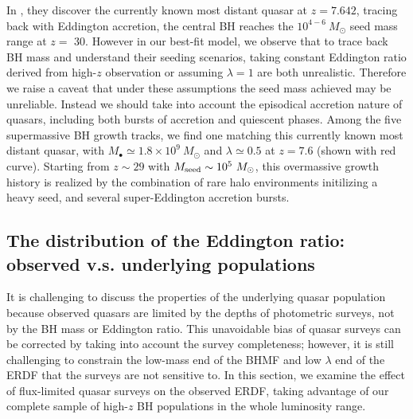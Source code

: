 \documentclass[twocolumn, twocolappendix]{aastex63}
\newcommand{\Msun}{M_\odot}
\newcommand{\red}[1]{\textcolor{red}{ #1}}
\begin{document}
\begin{CJK*}{UTF8}{gbsn}
In \citet{2021ApJ...907L...1W}, they discover the currently known most distant quasar at $z=7.642$, 
tracing back with Eddington accretion, the central BH reaches the $10^{4-6}~\Msun$ seed mass range at $z=$ 30. 
However in our best-fit model, we observe that to trace back BH mass and understand their seeding scenarios, 
taking constant Eddington ratio derived from high-$z$ observation or assuming $\lambda=1$ are both unrealistic. 
Therefore we raise a caveat that under these assumptions the seed mass achieved may be unreliable. 
Instead we should take into account the episodical accretion nature of quasars, 
including both bursts of accretion and quiescent phases.
Among the five supermassive BH growth tracks,
we find one matching this currently known most distant quasar, 
with $M_\bullet \simeq 1.8\times 10^9~\Msun$ and $\lambda \simeq 0.5$ at $z=7.6$ (shown with red curve).
Starting from $z\sim 29$ with $M_{\rm seed} \sim 10^5~\Msun$,
this overmassive growth history is realized by the combination of rare halo environments initilizing a heavy seed, 
and several super-Eddington accretion bursts.




\vspace{2mm}
\subsection{The distribution of the Eddington ratio: \\observed v.s. underlying populations}\label{sec:ldist}

It is challenging to discuss the properties of the underlying quasar population
because observed quasars are limited by the depths of photometric surveys, not by the BH mass or Eddington ratio.
This unavoidable bias of quasar surveys can be corrected by taking into account the survey completeness;
however, it is still challenging to constrain the low-mass end of the BHMF and low $\lambda$ end of the ERDF
that the surveys are not sensitive to.
In this section, we examine the effect of flux-limited quasar surveys on the observed ERDF, 
taking advantage of our complete sample of high-$z$ BH populations in the whole luminosity range. 



\end{CJK*}
\end{document}
